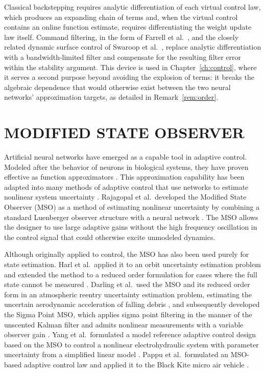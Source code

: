 Classical backstepping requires analytic differentiation of each virtual control
law, which produces an expanding chain of terms and, when the virtual control
contains an online function estimate, requires differentiating the weight update
law itself. Command filtering, in the form of Farrell et al.\ \cite{farrell2009command},
and the closely related dynamic surface control of Swaroop et al.\
\cite{swaroop2000dsc}, replace analytic differentiation with a
bandwidth-limited filter and compensate for the resulting filter error within
the stability argument. This device is used in Chapter~\ref{ch:control}, where
it serves a second purpose beyond avoiding the explosion of terms: it breaks the
algebraic dependence that would otherwise exist between the two neural networks'
approximation targets, as detailed in Remark~\ref{rem:order}.

\section{MODIFIED STATE OBSERVER}

Artificial neural networks have emerged as a capable tool in adaptive control.
Modeled after the behavior of neurons in biological systems, they have proven
effective as function approximators \cite{hornik1989multilayer,sadegh1993nonlinear}.
This approximation capability has been adapted into many methods of adaptive
control that use networks to estimate nonlinear system uncertainty
\cite{yang2013electrohydraulic,jagannathan2006neural}. Rajagopal et al.\
developed the Modified State Observer (MSO) as a method of estimating nonlinear
uncertainty by combining a standard Luenberger observer structure with a neural
network \cite{rajagopal2009mso}. The MSO allows the designer to use large
adaptive gains without the high frequency oscillation in the control signal that
could otherwise excite unmodeled dynamics.

Although originally applied to control, the MSO has also been used purely for
state estimation. Harl et al.\ applied it to an orbit uncertainty estimation
problem and extended the method to a reduced order formulation for cases where
the full state cannot be measured \cite{harl2011orbit}. Darling et al.\ used the
MSO and its reduced order form in an atmospheric reentry uncertainty estimation
problem, estimating the uncertain aerodynamic acceleration of falling debris
\cite{darling2012reentry}, and subsequently developed the Sigma Point MSO, which
applies sigma point filtering in the manner of the unscented Kalman filter and
admits nonlinear measurements with a variable observer gain
\cite{darling2013sigma}. Yang et al.\ formulated a model reference adaptive
control design based on the MSO to control a nonlinear electrohydraulic system
with parameter uncertainty from a simplified linear model
\cite{yang2013electrohydraulic}. Pappu et al.\ formulated an MSO-based adaptive
control law and applied it to the Black Kite micro air vehicle
\cite{pappu2014blackkite}.


